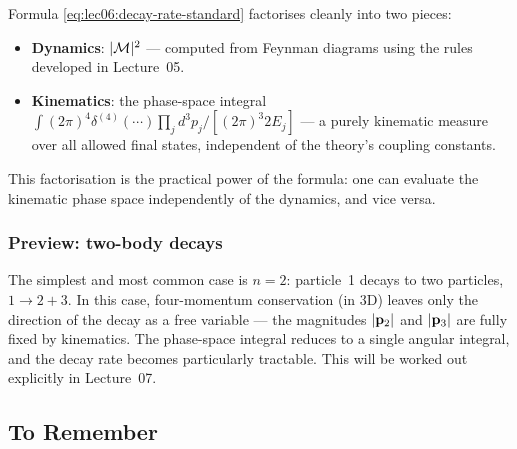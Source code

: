 \documentclass[../main.tex]{subfiles}
\begin{document}
\begin{remark}
Formula \eqref{eq:lec06:decay-rate-standard} factorises cleanly into two pieces:
\begin{itemize}
  \item \textbf{Dynamics}: $|\mathcal{M}|^2$ — computed from Feynman diagrams using the rules developed in Lecture~05.
  \item \textbf{Kinematics}: the phase-space integral $\int (2\pi)^4\delta^{(4)}(\cdots)\prod_j d^3p_j/[(2\pi)^3 2E_j]$ — a purely kinematic measure over all allowed final states, independent of the theory's coupling constants.
\end{itemize}
This factorisation is the practical power of the formula: one can evaluate the kinematic phase space independently of the dynamics, and vice versa.
\end{remark}

\subsubsection*{Preview: two-body decays}

The simplest and most common case is $n = 2$: particle~1 decays to two particles, $1 \to 2 + 3$.  In this case, four-momentum conservation (in 3D) leaves only the direction of the decay as a free variable — the magnitudes $|\mathbf{p}_2|$ and $|\mathbf{p}_3|$ are fully fixed by kinematics.  The phase-space integral reduces to a single angular integral, and the decay rate becomes particularly tractable.  This will be worked out explicitly in Lecture~07.

\subsection*{To Remember}
\end{document}
